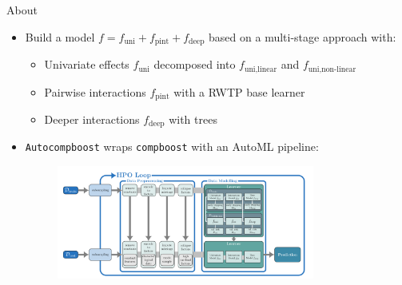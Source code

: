 \documentclass[t,10pt]{beamer}
\begin{document}
\begin{frame}{About}
  \begin{itemize}
    \item Build a model $f = f_{\text{uni}} + f_{\text{pint}} + f_{\text{deep}}$ based on a multi-stage approach with:
      \begin{itemize}
        \item Univariate effects $f_{\text{uni}}$ decomposed into $f_{\text{uni,linear}}$ and $f_{\text{uni,non-linear}}$
        \item Pairwise interactions $f_{\text{pint}}$ with a RWTP base learner
        \item Deeper interactions $f_{\text{deep}}$ with trees
      \end{itemize}
    \item \texttt{Autocompboost} wraps \texttt{compboost} with an AutoML pipeline:
      \begin{figure}
        \centering
        \includegraphics[width=0.8\textwidth]{figures/fig-acwb-ml-pipeline.png}
      \end{figure}
  \end{itemize}
	\addtocounter{framenumber}{-1}
\end{frame}
\end{document}
